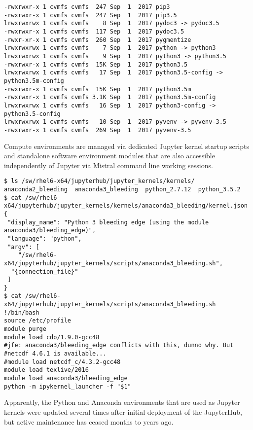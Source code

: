 \begin{verbatim}
-rwxrwxr-x 1 cvmfs cvmfs  247 Sep  1  2017 pip3
-rwxrwxr-x 1 cvmfs cvmfs  247 Sep  1  2017 pip3.5
lrwxrwxrwx 1 cvmfs cvmfs    8 Sep  1  2017 pydoc3 -> pydoc3.5
-rwxrwxr-x 1 cvmfs cvmfs  117 Sep  1  2017 pydoc3.5
-rwxr-xr-x 1 cvmfs cvmfs  260 Sep  1  2017 pygmentize
lrwxrwxrwx 1 cvmfs cvmfs    7 Sep  1  2017 python -> python3
lrwxrwxrwx 1 cvmfs cvmfs    9 Sep  1  2017 python3 -> python3.5
-rwxrwxr-x 1 cvmfs cvmfs  15K Sep  1  2017 python3.5
lrwxrwxrwx 1 cvmfs cvmfs   17 Sep  1  2017 python3.5-config -> python3.5m-config
-rwxrwxr-x 1 cvmfs cvmfs  15K Sep  1  2017 python3.5m
-rwxrwxr-x 1 cvmfs cvmfs 3.1K Sep  1  2017 python3.5m-config
lrwxrwxrwx 1 cvmfs cvmfs   16 Sep  1  2017 python3-config -> python3.5-config
lrwxrwxrwx 1 cvmfs cvmfs   10 Sep  1  2017 pyvenv -> pyvenv-3.5
-rwxrwxr-x 1 cvmfs cvmfs  269 Sep  1  2017 pyvenv-3.5
\end{verbatim}

Compute environments are managed via dedicated Jupyter kernel startup scripts and standalone software environment modules that are also accessible independently of Jupyter via Mistral command line working sessions.

\begin{verbatim}
$ ls /sw/rhel6-x64/jupyterhub/jupyter_kernels/kernels/
anaconda2_bleeding  anaconda3_bleeding  python_2.7.12  python_3.5.2
$ cat /sw/rhel6-x64/jupyterhub/jupyter_kernels/kernels/anaconda3_bleeding/kernel.json
{
 "display_name": "Python 3 bleeding edge (using the module anaconda3/bleeding_edge)",
 "language": "python",
 "argv": [
	"/sw/rhel6-x64/jupyterhub/jupyter_kernels/scripts/anaconda3_bleeding.sh",
  "{connection_file}"
 ]
}
$ cat /sw/rhel6-x64/jupyterhub/jupyter_kernels/scripts/anaconda3_bleeding.sh
!/bin/bash
source /etc/profile
module purge
module load cdo/1.9.0-gcc48
#jfe: anaconda3/bleeding_edge conflicts with this, dunno why. But
#netcdf 4.6.1 is available...
#module load netcdf_c/4.3.2-gcc48
module load texlive/2016
module load anaconda3/bleeding_edge
python -m ipykernel_launcher -f "$1"
\end{verbatim}

Apparently, the Python and Anaconda environments that are used as Jupyter kernels were updated several times after initial deployment of the JupyterHub, but active maintenance has ceased months to years ago.

